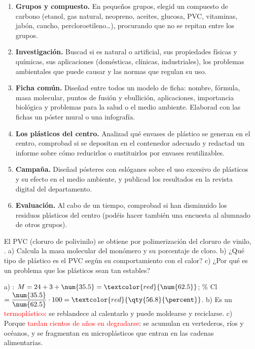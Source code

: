 \begin{enumerate}[label=\numberballred]
    \item \textbf{Grupos y compuesto.} En pequeños grupos, elegid un compuesto de carbono (etanol, gas natural, neopreno, aceites, glucosa, PVC, vitaminas, jabón, caucho, percloroetileno\ldots), procurando que no se repitan entre los grupos.
    \item \textbf{Investigación.} Buscad si es natural o artificial, sus propiedades físicas y químicas, sus aplicaciones (domésticas, clínicas, industriales), los problemas ambientales que puede causar y las normas que regulan su uso.
    \item \textbf{Ficha común.} Diseñad entre todos un modelo de ficha: nombre, fórmula, masa molecular, puntos de fusión y ebullición, aplicaciones, importancia biológica y problemas para la salud o el medio ambiente. Elaborad con las fichas un póster mural o una infografía.
    \item \textbf{Los plásticos del centro.} Analizad qué envases de plástico se generan en el centro, comprobad si se depositan en el contenedor adecuado y redactad un informe sobre cómo reducirlos o sustituirlos por envases reutilizables.
    \item \textbf{Campaña.} Diseñad pósteres con eslóganes sobre el uso excesivo de plásticos y su efecto en el medio ambiente, y publicad los resultados en la revista digital del departamento.
    \item \textbf{Evaluación.} Al cabo de un tiempo, comprobad si han disminuido los residuos plásticos del centro (podéis hacer también una encuesta al alumnado de otros grupos).
\end{enumerate}

\begin{exercise}
    El PVC (cloruro de polivinilo) se obtiene por polimerización del cloruro de vinilo, . a) Calcula la masa molecular del monómero y su porcentaje de cloro. b) ¿Qué tipo de plástico es el PVC según su comportamiento con el calor? c) ¿Por qué es un problema que los plásticos sean tan estables?
    \begin{solu}
        a) : \(M = 24 + 3 + \num{35.5} = \textcolor{red}{\num{62.5}}\); \% Cl \(= \dfrac{\num{35.5}}{\num{62.5}} \cdot 100 = \textcolor{red}{\qty{56.8}{\percent}}\).
        b) Es un \textcolor{red}{termoplástico}: se reblandece al calentarlo y puede moldearse y reciclarse.
        c) Porque \textcolor{red}{tardan cientos de años en degradarse}: se acumulan en vertederos, ríos y océanos, y se fragmentan en microplásticos que entran en las cadenas alimentarias.
    \end{solu}
\end{exercise}

